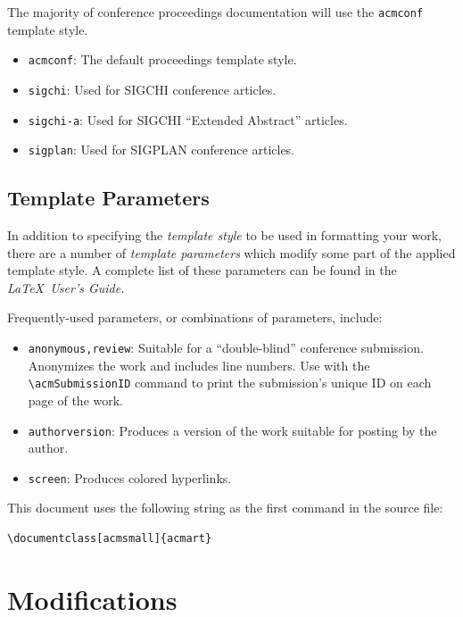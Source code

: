 \documentclass[
acmsmall,
nonacm,
screen,
acmthm]{../templates/acmart}
\begin{document}
The majority of conference proceedings documentation will use the
\texttt{acmconf} template style.

\begin{itemize}
\item
  \texttt{acmconf}: The default proceedings template style.
\item
  \texttt{sigchi}: Used for SIGCHI conference articles.
\item
  \texttt{sigchi-a}: Used for SIGCHI ``Extended Abstract'' articles.
\item
  \texttt{sigplan}: Used for SIGPLAN conference articles.
\end{itemize}

\hypertarget{template-parameters}{%
\subsection{Template Parameters}\label{template-parameters}}

In addition to specifying the \emph{template style} to be used in
formatting your work, there are a number of \emph{template parameters}
which modify some part of the applied template style. A complete list of
these parameters can be found in the \emph{LaTeX~User's Guide.}

Frequently-used parameters, or combinations of parameters, include:

\begin{itemize}
\item
  \texttt{anonymous,review}: Suitable for a ``double-blind'' conference
  submission. Anonymizes the work and includes line numbers. Use with
  the \texttt{\textbackslash{}acmSubmissionID} command to print the
  submission's unique ID on each page of the work.
\item
  \texttt{authorversion}: Produces a version of the work suitable for
  posting by the author.
\item
  \texttt{screen}: Produces colored hyperlinks.
\end{itemize}

This document uses the following string as the first command in the
source file:

\begin{verbatim}
\documentclass[acmsmall]{acmart}
\end{verbatim}

\hypertarget{modifications}{%
\section{Modifications}\label{modifications}}
\end{document}
